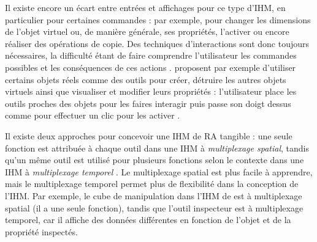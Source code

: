 
Il existe encore un écart entre entrées et affichages pour ce type d'IHM, en particulier pour certaines commandes : par exemple, pour changer les dimensions de l'objet virtuel ou, de manière générale, ses propriétés, l'activer ou encore réaliser des opérations de copie. Des techniques d'interactions sont donc toujours nécessaires, la difficulté étant de faire comprendre l'utilisateur les commandes possibles et les conséquences de ces actions \citep{Zhou2008}. \cite{Lee2004} proposent par exemple d'utiliser certains objets réels comme des outils pour créer, détruire les autres objets virtuels ainsi que visualiser et modifier leurs propriétés : l'utilisateur place les outils proches des objets pour les faires interagir puis passe son doigt dessus comme pour effectuer un clic pour les activer .

Il existe deux approches pour concevoir une IHM de RA tangible : une seule fonction est attribuée à chaque outil dans une IHM à \emph{multiplexage spatial}, tandis qu'un même outil est utilisé pour plusieurs fonctions selon le contexte dans une IHM à \emph{multiplexage temporel} \cite[p. 171]{Billinghurst2015}. Le multiplexage spatial est plus facile à apprendre, mais le multiplexage temporel permet plus de flexibilité dans la conception de l'IHM. Par exemple, le cube de manipulation dans l'IHM de \cite{Lee2004} est à multiplexage spatial (il a une seule fonction), tandis que l'outil inspecteur est à multiplexage temporel, car il affiche des données différentes en fonction de l'objet et de la propriété inspectés.


